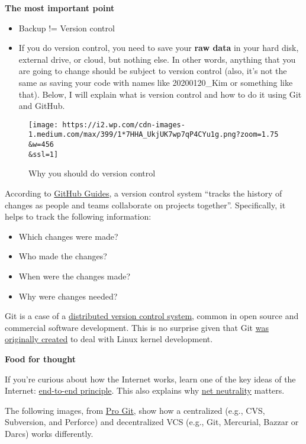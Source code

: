 \documentclass[
]{book}
\providecommand{\tightlist}{%
  \setlength{\itemsep}{0pt}\setlength{\parskip}{0pt}}
\begin{document}
\textbf{The most important point}

\begin{itemize}
\item
  Backup != Version control
\item
  If you do version control, you need to save your \textbf{raw data} in your hard disk, external drive, or cloud, but nothing else. In other words, anything that you are going to change should be subject to version control (also, it's not the same as saving your code with names like 20200120\_Kim or something like that). Below, I will explain what is version control and how to do it using Git and GitHub.
\end{itemize}

\begin{figure}
\centering
\texttt{[image: https://i2.wp.com/cdn-images-1.medium.com/max/399/1*7HHA\_UkjUK7wp7qP4CYu1g.png?zoom=1.75\\\&w=456\\\&ssl=1]}
\caption{Why you should do version control}
\end{figure}

According to \href{https://guides.GitHub.com}{GitHub Guides}, a version control system ``tracks the history of changes as people and teams collaborate on projects together''. Specifically, it helps to track the following information:

\begin{itemize}
\tightlist
\item
  Which changes were made?
\item
  Who made the changes?
\item
  When were the changes made?
\item
  Why were changes needed?
\end{itemize}

Git is a case of a \href{https://en.wikipedia.org/wiki/Distributed_version_control}{distributed version control system}, common in open source and commercial software development. This is no surprise given that Git \href{https://lkml.org/lkml/2005/4/6/121}{was originally created} to deal with Linux kernel development.

\textbf{Food for thought}

If you're curious about how the Internet works, learn one of the key ideas of the Internet: \href{https://en.wikipedia.org/wiki/End-to-end_principle}{end-to-end principle}. This also explains why \href{https://en.wikipedia.org/wiki/Net_neutrality}{net neutrality} matters.

The following images, from \href{git-scm.com}{Pro Git}, show how a centralized (e.g., CVS, Subversion, and Perforce) and decentralized VCS (e.g., Git, Mercurial, Bazzar or Darcs) works differently.
\end{document}
